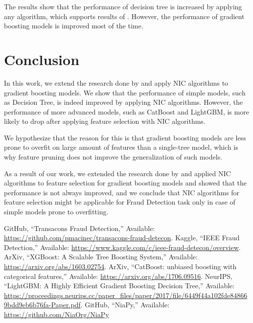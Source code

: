 \documentclass[conference]{IEEEtran}
\begin{document}
The results show that the performance of decision tree
is increased by applying any algorithm, which supports
results of \cite{github}. However, the performance of gradient
boosting models is improved most of the time.

\section{Conclusion}
In this work, we extend the research done by \cite{github} and
apply NIC algorithms to gradient boosting models. We show that
the performance of simple models, such as Decision Tree, is indeed
improved by applying NIC algorithms. However, the performance
of more advanced models, such as CatBoost and LightGBM, is more
likely to drop after applying feature selection with NIC algorithms.

We hypothesize that the reason for this is that gradient boosting
models are less prone to overfit on large amount of features than
a single-tree model, which is why feature pruning does not
improve the generalization of such models.

As a result of our work, we extended the research done by \cite{github}
and applied NIC algorithms to feature selection for gradient boosting
models and showed that the performance is not always improved,
and we conclude that NIC algorithms for feature selection
might be applicable for Fraud Detection task only in case of
simple models prone to overfitting.

\begin{thebibliography}{00}
	 GitHub, ``Transacons Fraud Detection,'' Available: \url{https://github.com/pmacinec/transacons-fraud-detecon}.
	 Kaggle, ``IEEE Fraud Detection,'' Available: \url{https://www.kaggle.com/c/ieee-fraud-detecon/overview}.
	 ArXiv, ``XGBoost: A Scalable Tree Boosting System,'' Available: \url{https://arxiv.org/abs/1603.02754}.
	 ArXiv, ``CatBoost: unbiased boosting with categorical features,'' Available: \url{https://arxiv.org/abs/1706.09516}.
	 NeurIPS, ``LightGBM: A Highly Efficient Gradient Boosting Decision Tree,'' Available: \url{https://proceedings.neurips.cc/paper_files/paper/2017/file/6449f44a102fde848669bdd9eb6b76fa-Paper.pdf}.
	 GitHub, ``NiaPy,'' Available: \url{https://github.com/NiaOrg/NiaPy}
\end{thebibliography}

\vspace{12pt}
\end{document}
